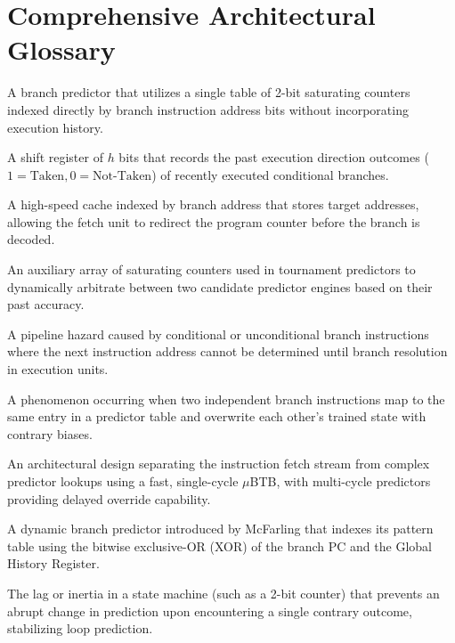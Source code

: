 \documentclass[11pt,a4paper]{article}
\begin{document}
\section{Comprehensive Architectural Glossary}
\label{sec:glossary}

\begin{description}[leftmargin=1.8em, itemsep=0.5em]
    \item[\textbf{Bimodal Predictor:}] A branch predictor that utilizes a single table of 2-bit saturating counters indexed directly by branch instruction address bits without incorporating execution history.
    \item[\textbf{Branch History Register (BHR):}] A shift register of $h$ bits that records the past execution direction outcomes ($1 = \text{Taken}, 0 = \text{Not-Taken}$) of recently executed conditional branches.
    \item[\textbf{Branch Target Buffer (BTB):}] A high-speed cache indexed by branch address that stores target addresses, allowing the fetch unit to redirect the program counter before the branch is decoded.
    \item[\textbf{Chooser Table (Meta-Predictor):}] An auxiliary array of saturating counters used in tournament predictors to dynamically arbitrate between two candidate predictor engines based on their past accuracy.
    \item[\textbf{Control Hazard:}] A pipeline hazard caused by conditional or unconditional branch instructions where the next instruction address cannot be determined until branch resolution in execution units.
    \item[\textbf{Destructive Aliasing:}] A phenomenon occurring when two independent branch instructions map to the same entry in a predictor table and overwrite each other's trained state with contrary biases.
    \item[\textbf{Front-End Decoupling:}] An architectural design separating the instruction fetch stream from complex predictor lookups using a fast, single-cycle $\mu$BTB, with multi-cycle predictors providing delayed override capability.
    \item[\textbf{Gshare Predictor:}] A dynamic branch predictor introduced by McFarling that indexes its pattern table using the bitwise exclusive-OR (XOR) of the branch PC and the Global History Register.
    \item[\textbf{Hysteresis:}] The lag or inertia in a state machine (such as a 2-bit counter) that prevents an abrupt change in prediction upon encountering a single contrary outcome, stabilizing loop prediction.

\end{description}
\end{document}
